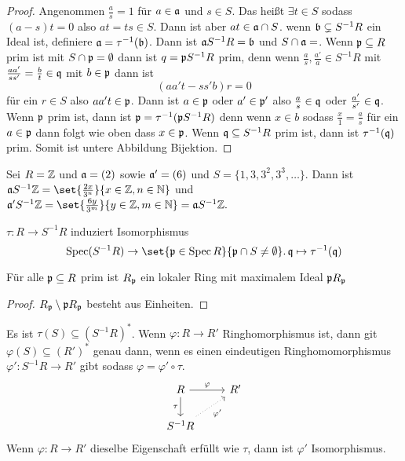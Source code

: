 \begin{proof}
    Angenommen \(\frac a s=1\) für \(a\in\mathfrak{a}\) und \(s\in S\). Das heißt \(\exists t\in S\) sodass \((a-s)t=0\) also \(at=ts\in S\). Dann ist aber \(at\in \mathfrak{a}\cap S\).
    wenn \(\mathfrak{b}\subsetneq S^{-1}R\) ein Ideal ist, definiere \(\mathfrak{a}=\tau^{-1}(\mathfrak{b})\). Dann ist \(\mathfrak{a} S^{-1}R=\mathfrak{b}\) und \(S\cap\fraka=\empty\).
    Wenn \(\mathfrak{p}\subseteq R\) prim ist mit \(S\cap\mathfrak{p}=\emptyset\) dann ist \(q=\mathfrak{p} S^{-1}R\) prim, denn wenn \(\frac a s,\frac{a'}{a}\in S^{-1}R\) mit \(\frac{aa'}{ss'}=\frac b t\in \mathfrak{q}\) mit \(b\in\mathfrak{p}\) dann ist 
    \[(aa't-ss'b)r=0\] für ein \(r\in S\) also \(aa't\in \mathfrak{p}\). Dann ist \(a\in\mathfrak{p}\) oder \(a'\in\mathfrak{p}'\) also \(\frac a s\in\mathfrak{q}\) oder \(\frac{a'}{s'}\in\mathfrak{q}\).
    Wenn \(\mathfrak{p}\) prim ist, dann ist \(\mathfrak{p}=\tau^{-1}(\mathfrak{p} S^{-1}R)\) denn wenn \(x\in b\) sodass \(\frac x 1=\frac a s\) für ein \(a\in\mathfrak{p}\) dann folgt wie oben dass \(x\in\mathfrak{p}\).
    Wenn \(\mathfrak{q}\subseteq S^{-1}R\) prim ist, dann ist \(\tau^{-1}(\mathfrak{q})\) prim. Somit ist untere Abbildung Bijektion.
    
\end{proof}
\begin{Bsp}
    Sei \(R=\mathbb{Z}\) und \(\mathfrak{a}=(2)\) sowie \(\mathfrak{a}'=(6)\) und \(S=\{1,3,3^2,3^3,\dots\}\). Dann ist \(\fraka S^{-1}\ZZ=\set{\frac{2x}{3^n}}{x\in\ZZ, n\in\NN}\) und \(\fraka'S^{-1}\ZZ=\set{\frac{6y}{3^m}}{y\in\ZZ, m\in \NN}=\fraka S^{-1}\ZZ.\)
\end{Bsp}
\begin{Kor}
    \(\tau\colon R\to S^{-1}R\) induziert Isomorphismus \[\Spec(S^{-1}R)\to \set{\frakp\in\Spec R}{\frakp\cap S\neq\emptyset}.\, \frakq\mapsto \tau^{-1}(\frakq)\]
\end{Kor}
\begin{Kor}
    Für alle \(\mathfrak{p}\subseteq R\) prim ist \(R_{\mathfrak{p}}\) ein lokaler Ring mit maximalem Ideal \(\mathfrak{p} R_{\mathfrak{p}}\)
\end{Kor}
\begin{proof}
    \(R_{\mathfrak{p}}\setminus \mathfrak{p} R_{\mathfrak{p}}\) besteht aus Einheiten.
\end{proof}
\begin{Satz}\label{Satz:UnivEigLok}
Es ist \(\tau(S)\subseteq (S^{-1}R)^*\). Wenn \(\varphi\colon R\to R'\) Ringhomorphismus ist, dann git \(\varphi(S)\subseteq (R')^*\) genau dann, wenn es einen eindeutigen Ringhomomorphismus \(\varphi'\colon S^{-1}R\to R'\) gibt sodass \(\varphi=\varphi'\circ\tau.\)
$$%
\begin{tikzcd}
R \arrow[d, "\tau"'] \arrow[r, "\varphi"] & R' \\
S^{-1}R \arrow[ru, "\varphi'"', dotted]   &   
\end{tikzcd}$$
Wenn \(\varphi\colon R\to R'\) dieselbe Eigenschaft erfüllt wie \(\tau\), dann ist \(\varphi'\) Isomorphismus.
\end{Satz}

